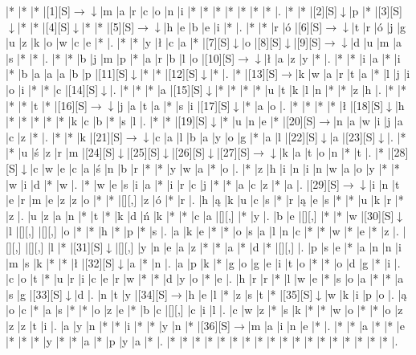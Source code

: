\documentclass[11pt]{article}
\newcommand\drarr{$\rightarrow \!\!\!\!\! \downarrow$}
\newcommand\rarr{$\rightarrow$}
\newcommand\darr{$\downarrow$}
\begin{document}
\noindent\begin{Puzzle}{17}{31}|*	|*	|*	|[1][S]\drarr	|m	|a	|r	|c	|o	|n	|i	|*	|*	|*	|*	|*	|*	|*	|.
|*	|*	|[2][S]\darr	|p	|*	|[3][S]\darr	|*	|*	|[4][S]\darr	|*	|*	|[5][S]\drarr	|h	|e	|b	|e	|i	|*	|.
|*	|*	|r	|ó	|[6][S]\drarr	|t	|r	|ó	|j	|g	|u	|z	|k	|o	|w	|c	|e	|*	|.
|*	|*	|y	|ł	|c	|a	|*	|[7][S]\darr	|o	|[8][S]\darr	|[9][S]\drarr	|d	|u	|m	|a	|s	|*	|*	|.
|*	|*	|b	|j	|m	|p	|*	|a	|r	|b	|l	|o	|[10][S]\drarr	|ł	|a	|z	|y	|*	|.
|*	|*	|i	|a	|*	|i	|*	|b	|a	|a	|a	|b	|p	|[11][S]\darr	|*	|*	|[12][S]\darr	|*	|.
|*	|[13][S]\rarr	|k	|w	|a	|r	|t	|a	|*	|l	|j	|i	|o	|i	|*	|*	|c	|[14][S]\darr	|.
|*	|*	|*	|a	|[15][S]\darr	|*	|*	|*	|*	|u	|t	|k	|l	|n	|*	|*	|z	|h	|.
|*	|*	|*	|*	|t	|*	|[16][S]\drarr	|j	|a	|t	|a	|*	|s	|i	|[17][S]\darr	|*	|a	|o	|.
|*	|*	|*	|*	|ł	|[18][S]\darr	|h	|*	|*	|*	|*	|*	|k	|c	|b	|*	|s	|l	|.
|*	|*	|[19][S]\darr	|*	|u	|n	|e	|*	|[20][S]\rarr	|n	|a	|w	|i	|j	|a	|c	|z	|*	|.
|*	|*	|k	|[21][S]\drarr	|c	|a	|l	|b	|a	|y	|o	|g	|*	|a	|l	|[22][S]\darr	|a	|[23][S]\darr	|.
|*	|*	|u	|ś	|z	|r	|m	|[24][S]\darr	|[25][S]\darr	|[26][S]\darr	|[27][S]\drarr	|k	|a	|t	|o	|n	|*	|t	|.
|*	|[28][S]\darr	|c	|w	|e	|c	|a	|ś	|n	|b	|r	|*	|*	|y	|w	|a	|*	|o	|.
|*	|z	|h	|i	|n	|i	|n	|w	|a	|o	|y	|*	|*	|w	|i	|d	|*	|w	|.
|*	|w	|e	|s	|i	|a	|*	|i	|r	|c	|j	|*	|*	|a	|c	|z	|*	|a	|.
|[29][S]\drarr	|i	|n	|t	|e	|r	|m	|e	|z	|z	|o	|*	|*	|[][,]{ }	|z	|ó	|*	|r	|.
|h	|ą	|k	|u	|c	|s	|*	|r	|ą	|e	|s	|*	|*	|u	|k	|r	|*	|z	|.
|u	|z	|a	|n	|*	|t	|*	|k	|d	|ń	|k	|*	|*	|c	|a	|[][,]{ }	|*	|y	|.
|b	|e	|[][,]{ }	|*	|*	|w	|[30][S]\darr	|l	|[][,]{ }	|[][,]{ }	|o	|*	|*	|h	|*	|p	|*	|s	|.
|a	|k	|e	|*	|*	|o	|s	|a	|l	|n	|c	|*	|*	|w	|*	|e	|*	|z	|.
|[][,]{ }	|[][,]{ }	|l	|*	|[31][S]\darr	|[][,]{ }	|y	|n	|e	|a	|z	|*	|*	|a	|*	|d	|*	|[][,]{ }	|.
|p	|s	|e	|*	|a	|n	|n	|i	|m	|s	|k	|*	|*	|ł	|[32][S]\darr	|a	|*	|n	|.
|a	|p	|k	|*	|g	|o	|g	|e	|i	|t	|o	|*	|*	|o	|d	|g	|*	|i	|.
|c	|o	|t	|*	|u	|r	|i	|c	|e	|r	|w	|*	|*	|d	|y	|o	|*	|e	|.
|h	|r	|r	|*	|l	|w	|e	|*	|s	|o	|a	|*	|*	|a	|s	|g	|[33][S]\darr	|d	|.
|n	|t	|y	|[34][S]\rarr	|h	|e	|l	|*	|z	|s	|t	|*	|[35][S]\darr	|w	|k	|i	|p	|o	|.
|ą	|o	|c	|*	|a	|s	|*	|*	|o	|z	|e	|*	|b	|c	|[][,]{ }	|c	|i	|l	|.
|c	|w	|z	|*	|s	|k	|*	|*	|w	|o	|*	|*	|o	|z	|z	|z	|t	|i	|.
|a	|y	|n	|*	|*	|i	|*	|*	|y	|n	|*	|[36][S]\rarr	|m	|a	|i	|n	|e	|*	|.
|*	|*	|a	|*	|*	|e	|*	|*	|*	|y	|*	|*	|a	|*	|p	|y	|a	|*	|.
|*	|*	|*	|*	|*	|*	|*	|*	|*	|*	|*	|*	|*	|*	|*	|*	|*	|*	|.\end{Puzzle}

\newpage
\end{document}
